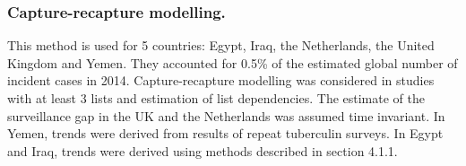 \subsubsection {Capture-recapture modelling.} This method is used for 5 countries: Egypt\cite{20487611}, Iraq\cite{23485379}, the Netherlands\cite{17156496}, the United Kingdom\cite{Anderson2010} and Yemen\cite{23485378}. They accounted for 0.5\% of the estimated global number of incident cases in 2014. Capture-recapture modelling was considered in studies with at least 3 lists and estimation of list dependencies\cite{WHO2012}. The estimate of the surveillance gap in the UK and the Netherlands was assumed time invariant. In Yemen, trends were derived from results of repeat tuberculin surveys\cite{19723398}. In Egypt and Iraq, trends were derived using methods described in section 4.1.1.

